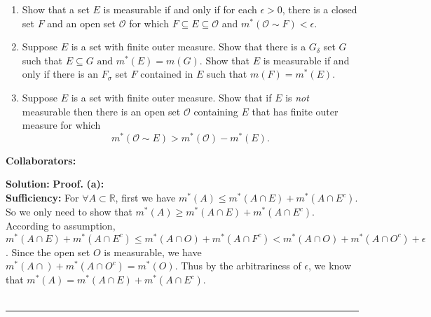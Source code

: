 \documentclass{article}%
\newenvironment{proof}[1][Proof]{\textbf{#1.} }{\ \rule{0.5em}{0.5em}}
\begin{document}
\begin{enumerate}
\begin{enumerate}
\item Show that a set $E$ is measurable if and only if for each $\epsilon > 0$, there is a closed set $F$ and an open set $\mathcal{O}$ for which $F\subseteq E \subseteq \mathcal{O}$ and $m^*(\mathcal{O} \sim F)< \epsilon.$
\item Suppose $E$ is a set with finite outer measure. Show that there is a $G_{\delta}$ set $G$ such that $
 E \subseteq G \text{ and } m^*(E) = m(G).$  Show that $E$ is measurable if and only if there is an $F_{\sigma}$ set $F$ contained in $E$ such that $m(F) = m^*(E)$.
\item Suppose $E$ is a set with finite outer measure. Show that if $E$ is \emph{not} measurable then there is an open set $\mathcal{O}$ containing $E$ that has finite outer measure for which \[
m^*(\mathcal{O}\sim E) > m^*(\mathcal{O}) - m^*(E).                                                                                                                                                                                                
                                                                                                                                                                                               \]

  
\end{enumerate}


\bigskip
\textbf{Collaborators:}\\
\smallskip
 
\textbf{Solution:}
\begin{proof}
\textbf{(a):}\\[2pt]
\textbf{Sufficiency:}
For $\forall A\subset \mathbb{R}$, first we have $m^*(A) \le m^*(A\cap E) + m^*(A\cap E^c)$. So we only need to show that $m^*(A) \ge m^*(A\cap E) + m^*(A\cap E^c)$. According to assumption, $m^*(A\cap E) + m^*(A\cap E^c) \le m^*(A\cap O)+m^*(A\cap F^c) < m^*(A\cap O)+m^*(A\cap O^c)+\epsilon$. Since the open set $O$ is measurable, we have $m^*(A\cap )+m^*(A\cap O^c) = m^*(O)$. Thus by the arbitrariness of $\epsilon$, we know that $m^*(A) = m^*(A\cap E)+m^*(A\cap E^c)$. \\[2pt]


\end{proof}
\end{enumerate}
\end{document}
